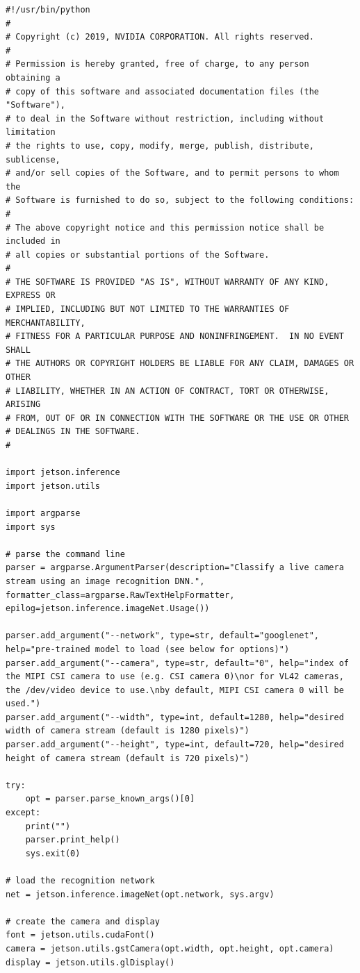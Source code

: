 \begin{lstlisting}
#!/usr/bin/python
#
# Copyright (c) 2019, NVIDIA CORPORATION. All rights reserved.
#
# Permission is hereby granted, free of charge, to any person obtaining a
# copy of this software and associated documentation files (the "Software"),
# to deal in the Software without restriction, including without limitation
# the rights to use, copy, modify, merge, publish, distribute, sublicense,
# and/or sell copies of the Software, and to permit persons to whom the
# Software is furnished to do so, subject to the following conditions:
#
# The above copyright notice and this permission notice shall be included in
# all copies or substantial portions of the Software.
#
# THE SOFTWARE IS PROVIDED "AS IS", WITHOUT WARRANTY OF ANY KIND, EXPRESS OR
# IMPLIED, INCLUDING BUT NOT LIMITED TO THE WARRANTIES OF MERCHANTABILITY,
# FITNESS FOR A PARTICULAR PURPOSE AND NONINFRINGEMENT.  IN NO EVENT SHALL
# THE AUTHORS OR COPYRIGHT HOLDERS BE LIABLE FOR ANY CLAIM, DAMAGES OR OTHER
# LIABILITY, WHETHER IN AN ACTION OF CONTRACT, TORT OR OTHERWISE, ARISING
# FROM, OUT OF OR IN CONNECTION WITH THE SOFTWARE OR THE USE OR OTHER
# DEALINGS IN THE SOFTWARE.
#

import jetson.inference
import jetson.utils

import argparse
import sys

# parse the command line
parser = argparse.ArgumentParser(description="Classify a live camera stream using an image recognition DNN.", formatter_class=argparse.RawTextHelpFormatter, epilog=jetson.inference.imageNet.Usage())

parser.add_argument("--network", type=str, default="googlenet", help="pre-trained model to load (see below for options)")
parser.add_argument("--camera", type=str, default="0", help="index of the MIPI CSI camera to use (e.g. CSI camera 0)\nor for VL42 cameras, the /dev/video device to use.\nby default, MIPI CSI camera 0 will be used.")
parser.add_argument("--width", type=int, default=1280, help="desired width of camera stream (default is 1280 pixels)")
parser.add_argument("--height", type=int, default=720, help="desired height of camera stream (default is 720 pixels)")

try:
	opt = parser.parse_known_args()[0]
except:
	print("")
	parser.print_help()
	sys.exit(0)

# load the recognition network
net = jetson.inference.imageNet(opt.network, sys.argv)

# create the camera and display
font = jetson.utils.cudaFont()
camera = jetson.utils.gstCamera(opt.width, opt.height, opt.camera)
display = jetson.utils.glDisplay()


\end{lstlisting}
